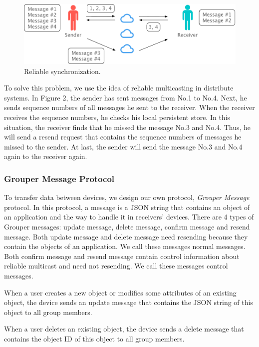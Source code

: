 \documentclass[twocolumn,10pt]{article}
\begin{document}
\begin{figure}[t]
	\centering
	\includegraphics[scale=0.3]{reliable_sync}
	\caption{Reliable synchronization.}
\end{figure}

To solve this problem, we use the idea of reliable multicasting in distribute systems. 
In Figure 2, the sender has sent messages from No.1 to No.4. 
Next, he sends sequence numbers of all messages he sent to the receiver. 
When the receiver receives the sequence numbers, he checks his local persistent store. 
In this situation, the receiver finds that he missed the message No.3 and No.4. 
Thus, he will send a resend request that contains the sequence numbers of messages he missed to the sender. 
At last, the sender will send the message No.3 and No.4 again to the receiver again.

\subsubsection{Grouper Message Protocol}

To transfer data between devices, we design our own protocol, \emph{Grouper Message} protocol. 
In this protocol, a message is a JSON string that contains an object of an application and the way to handle it in receivers’ devices. 
There are 4 types of Grouper messages: update message, delete message, confirm message and resend message. 
Both update message and delete message need resending because they contain the objects of an application. 
We call these messages normal messages. 
Both confirm message and resend message contain control information about reliable multicast and need not resending. 
We call these messages control messages.

When a user creates a new object or modifies some attributes of an existing object, the device sends an update message that contains the JSON string of this object to all group members.

When a user deletes an existing object, the device sends a delete message that contains the object ID of this object to all group members.
\end{document}
